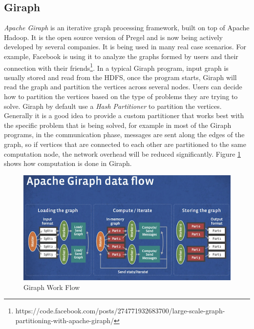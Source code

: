 \documentclass[english]{tktltiki}
\begin{document}
\subsection{Giraph}
\textit{Apache Giraph} is an iterative graph processing framework, built on top of Apache Hadoop. It is the open source version of Pregel and is now being actively developed by several companies. It is being used in many real case scenarios. For example, Facebook is using it to analyze the graphs formed by users and their connection with their friends\footnote{https://code.facebook.com/posts/274771932683700/large-scale-graph-partitioning-with-apache-giraph/}. 
In a typical Giraph program, input graph is usually stored and read from the HDFS, once the program starts, Giraph will read the graph and partition the vertices across several nodes. Users can decide how to partition the vertices based on the type of problems they are trying to solve. Giraph by default use a \textit{Hash Partitioner} to partition the vertices. Generally it is a good idea to provide a custom partitioner that works best with the specific problem that is being solved, for example in most of the Giraph programs, in the communication phase, messages are sent along the edges of the graph, so if vertices that are connected to each other are partitioned to the same computation node, the network overhead will be reduced significantly.    
Figure \ref{fig:giraph} shows how computation is done in Giraph.
\begin{figure}[ht!]
\centering
\includegraphics[width=150mm]{figures/giraphdataflow.png}
\caption{Giraph Work Flow \protect \footnotemark}
\label{fig:giraph}
\end{figure}
\end{document}
